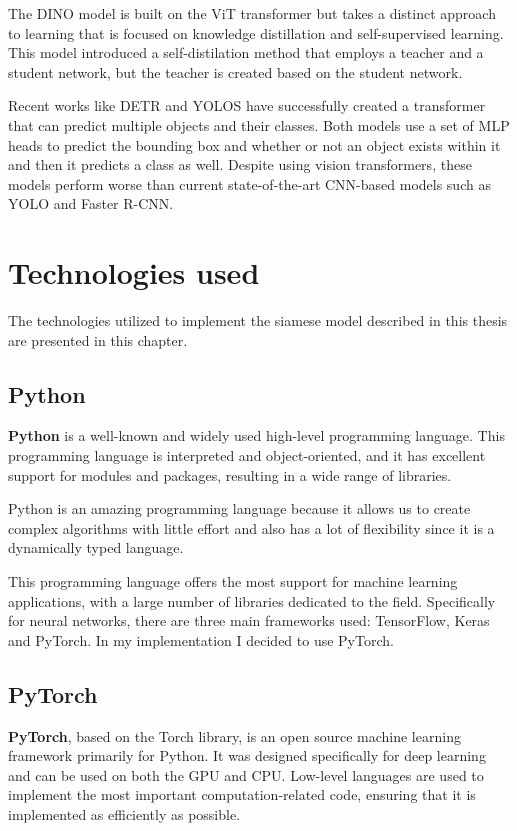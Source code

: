 \documentclass{report}[12pt, a4paper]
\begin{document}
The DINO model \cite{dino_paper} is built on the ViT transformer but takes a distinct approach to learning that is focused on knowledge distillation and self-supervised learning. This model introduced a self-distilation method that employs a teacher and a student network, but the teacher is created based on the student network.

Recent works like DETR\cite{detr_paper} and YOLOS\cite{yolos_paper} have successfully created a transformer that can predict multiple objects and their classes. Both models use a set of MLP heads to predict the bounding box and whether or not an object exists within it and then it predicts a class as well. Despite using vision transformers, these models perform worse than current state-of-the-art CNN-based models such as YOLO\cite{yolo_paper} and Faster R-CNN\cite{faster_rcnn_paper}.


\chapter{Technologies used}

The technologies utilized to implement the siamese model described in this thesis are presented in this chapter.

\section{Python}

\textbf{Python} is a well-known and widely used high-level programming language. This programming language is interpreted and object-oriented, and it has excellent support for modules and packages, resulting in a wide range of libraries.

Python is an amazing programming language because it allows us to create complex algorithms with little effort and also has a lot of flexibility since it is a dynamically typed language.

This programming language offers the most support for machine learning applications, with a large number of libraries dedicated to the field. Specifically for neural networks, there are three main frameworks used: TensorFlow, Keras and PyTorch. In my implementation I decided to use PyTorch.

\section{PyTorch}

\textbf{PyTorch}, based on the Torch library, is an open source machine learning framework primarily for Python. It was designed specifically for deep learning and can be used on both the GPU and CPU. Low-level languages are used to implement the most important computation-related code, ensuring that it is implemented as efficiently as possible.
\end{document}

